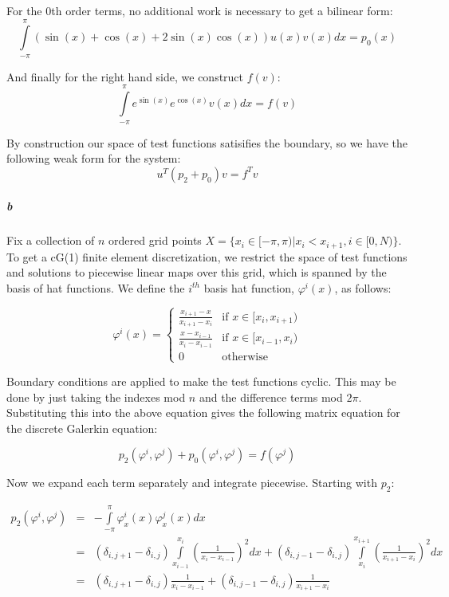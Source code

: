 \documentclass{article}
\begin{document}
For the 0th order terms, no additional work is necessary to get a bilinear form:
\[ \int \limits_{-\pi}^{\pi} \left( \sin(x) + \cos(x) + 2 \sin(x) \cos(x) \right) u(x) v(x) dx = p_0(x) \]

And finally for the right hand side, we construct $f(v)$:
\[ \int \limits_{-\pi}^{\pi} e^{\sin(x)} e^{\cos(x)} v(x) dx = f(v) \]

By construction our space of test functions satisifies the boundary, so we have the following weak form for the system:
\[ u^T (p_2 + p_0) v = f^T v \]

\subparagraph{b}

Fix a collection of $n$ ordered grid points $X = \{ x_i \in [-\pi, \pi) | x_i < x_{i+1}, i \in [0,N) \}$.  To get a cG(1) finite element discretization, we restrict the space of test functions and solutions to piecewise linear maps over this grid, which is spanned by the basis of hat functions.  We define the $i^{th}$ basis hat function, $\varphi^i(x)$, as follows:

\[ \varphi^i(x) = \left \{ \begin{array}{cc}
\frac{x_{i+1} - x}{x_{i+1} - x_{i}} & \textrm{if } x \in [x_{i},   x_{i+1}) \\
\frac{x - x_{i-1}}{x_{i} - x_{i-1}} & \textrm{if } x \in [x_{i-1}, x_{i})   \\
0 & \textrm{otherwise}
\end{array} \right. \]

Boundary conditions are applied to make the test functions cyclic.  This may be done by just taking the indexes mod $n$ and the difference terms mod $2 \pi$.  Substituting this into the above equation gives the following matrix equation for the discrete Galerkin equation:

\[ p_2(\varphi^i, \varphi^j) + p_0(\varphi^i, \varphi^j) = f(\varphi^j) \]

Now we expand each term separately and integrate piecewise.  Starting with $p_2$:

\begin{eqnarray*}
p_2(\varphi^i, \varphi^j) & = & - \int \limits_{-\pi}^{\pi} \varphi^i_x(x) \varphi^j_x(x) dx \\
& = & \left( \delta_{i,j+1} - \delta_{i,j} \right) \int \limits_{x_{i-1}}^{x_{i}} \left( \frac{1}{x_{i} - x_{i-1}} \right)^2 dx 
+ \left( \delta_{i,j-1} - \delta_{i,j} \right) \int \limits_{x_{i}}^{x_{i+1}}  \left( \frac{1}{x_{i+1} - x_{i}} \right)^2 dx \\
& = & \left( \delta_{i,j+1} - \delta_{i,j} \right) \frac{1}{x_{i} - x_{i-1}} 
+ \left( \delta_{i,j-1} - \delta_{i,j} \right) \frac{1}{x_{i+1} - x_{i}}
\end{eqnarray*}
\end{document}
